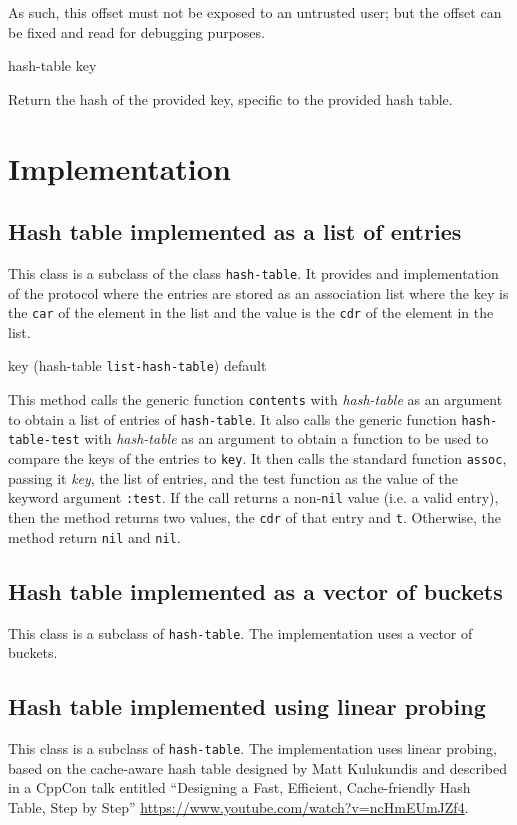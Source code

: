 As such, this offset must not be exposed to an untrusted user; but the
offset can be fixed and read for debugging purposes.

 {hash-table key}

Return the hash of the provided key, specific to the provided hash table.

\section{Implementation}

\subsection{Hash table implemented as a list of entries}


This class is a subclass of the class \texttt{hash-table}.
It provides and implementation of the protocol where the entries are
stored as an association list where the key is the \texttt{car} of the
element in the list and the value is the \texttt{cdr} of the element
in the list.

{\small{} {key (hash-table {\tt list-hash-table})
    \optional default}
}

This method calls the generic function \texttt{contents} with
\textit{hash-table} as an argument to obtain a list of entries of
\texttt{hash-table}.  It also calls the generic function
\texttt{hash-table-test} with \textit{hash-table} as an argument to
obtain a function to be used to compare the keys of the entries to
\texttt{key}.  It then calls the standard \commonlisp{} function
\texttt{assoc}, passing it \textit{key}, the list of entries, and the
test function as the value of the keyword argument \texttt{:test}.  If
the call returns a non-\texttt{nil} value (i.e. a valid entry), then
the method returns two values, the \texttt{cdr} of that entry and
\texttt{t}.  Otherwise, the method return \texttt{nil} and
\texttt{nil}.

\subsection{Hash table implemented as a vector of buckets}


This class is a subclass of \texttt{hash-table}.  The implementation
uses a vector of buckets.

\subsection{Hash table implemented using linear probing}


This class is a subclass of \texttt{hash-table}.  The implementation
uses linear probing, based on the cache-aware hash table designed by
Matt Kulukundis and described in a CppCon talk entitled
``Designing a Fast, Efficient, Cache-friendly Hash Table, Step by Step''
\url{https://www.youtube.com/watch?v=ncHmEUmJZf4}.